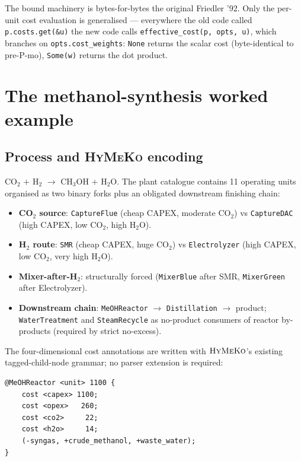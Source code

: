 \documentclass[11pt,a4paper]{article}
\newcommand{\HyMeKo}{\textsc{HyMeKo}}
\newcommand{\code}[1]{\texttt{\small #1}}
\begin{document}
The bound machinery is bytes-for-bytes the original Friedler '92.
Only the per-unit cost evaluation is generalised --- everywhere
the old code called \code{p.costs.get(\&u)} the new code calls
\code{effective\_cost(p, opts, u)}, which branches on
\code{opts.cost\_weights}: \code{None} returns the scalar cost
(byte-identical to pre-P-mo), \code{Some(w)} returns the dot
product.

\section{The methanol-synthesis worked example}

\subsection{Process and \HyMeKo{} encoding}

CO$_2$ $+$ H$_2$ $\to$ CH$_3$OH $+$ H$_2$O. The plant catalogue
contains 11 operating units organised as two binary forks plus an
obligated downstream finishing chain:

\begin{itemize}[itemsep=1pt]
\item \textbf{CO$_2$ source}: \code{CaptureFlue} (cheap CAPEX,
      moderate CO$_2$) vs \code{CaptureDAC} (high CAPEX, low
      CO$_2$, high H$_2$O).
\item \textbf{H$_2$ route}: \code{SMR} (cheap CAPEX, huge CO$_2$)
      vs \code{Electrolyzer} (high CAPEX, low CO$_2$, very high
      H$_2$O).
\item \textbf{Mixer-after-H$_2$}: structurally forced
      (\code{MixerBlue} after SMR, \code{MixerGreen} after
      Electrolyzer).
\item \textbf{Downstream chain}: \code{MeOHReactor} $\to$
      \code{Distillation} $\to$ product; \code{WaterTreatment}
      and \code{SteamRecycle} as no-product consumers of
      reactor by-products (required by strict no-excess).
\end{itemize}

The four-dimensional cost annotations are written with
$\HyMeKo$'s existing tagged-child-node grammar; no parser
extension is required:

\begin{lstlisting}
@MeOHReactor <unit> 1100 {
    cost <capex> 1100;
    cost <opex>   260;
    cost <co2>     22;
    cost <h2o>     14;
    (-syngas, +crude_methanol, +waste_water);
}
\end{lstlisting}
\end{document}
